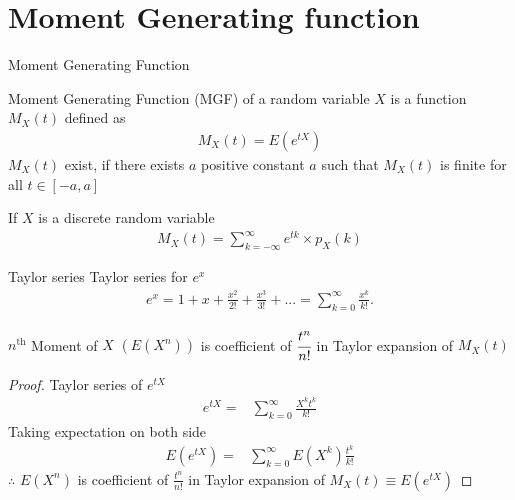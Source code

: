 \documentclass{beamer}
\providecommand{\brak}[1]{\ensuremath{\left(#1\right)}}
\begin{document}
\section{Moment Generating function}
\begin{frame}{Moment Generating Function}
    \begin{definition}
    Moment Generating Function (MGF) of a random variable $X$ is a function $M_X(t)$ defined as
    \begin{align}
        M_{X}\brak{t} = E\brak{e^{t X}}
    \end{align}
    $M_X(t)$ exist, if there exists $a$ positive constant $a$ such that $M_X(t)$ is finite for all $t \in [-a,a]$
\end{definition}

\begin{block}{}
If $X$ is a discrete random variable 
    \begin{align}
        M_{X}\brak{t}  = \sum_{k=-\infty}^{\infty} e^{t k}\times p_X\brak{k}
    \end{align}
\end{block}
\end{frame}

\begin{frame}{}
    \begin{block}{Taylor series}
    Taylor series for $e^x$
\begin{align}
e^x=1+x+\frac{x^2}{2!}+\frac{x^3}{3!}+...=\sum_{k=0}^{\infty} \frac{x^k}{k!}.
\end{align}

\end{block}
\vspace{4pt}
\begin{theorem}
$n^{\text{th}}$ Moment of $X$ \brak{E\brak{X^n}} is coefficient of $\cfrac{t^n}{n!}$ in Taylor expansion of $M_X(t)$
\label{nth-Moment-Theorem}
\end{theorem}

\end{frame}

\begin{frame}{}
    \begin{proof}
Taylor series of $e^{t X}$ 
\begin{align}
    e^{t X}=&\sum_{k=0}^{\infty} \frac{X^k{t}^k}{k!}
\end{align}
Taking expectation on both side
\begin{align}
    E\brak{e^{t X}}=&\sum_{k=0}^{\infty}E\brak{X^k} \frac{{t}^k}{k!}
\end{align}
$\therefore$ $E\brak{X^n}$ is coefficient of $\frac{{t}^n}{n!}$ in Taylor expansion of $M_X(t) \equiv E\brak{e^{t X}}$  
\end{proof}
\end{frame}
\end{document}

